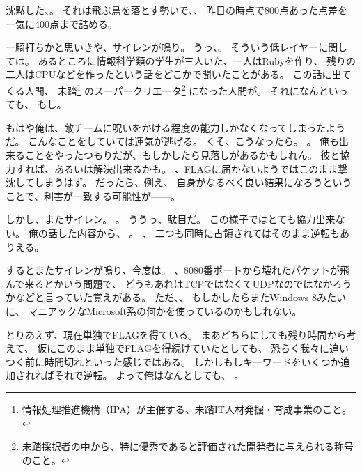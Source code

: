 沈黙した、。
それは飛ぶ鳥を落とす勢いで、、
昨日の時点で800点あった点差を一気に400点まで詰める。

一騎打ちかと思いきや、サイレンが鳴り。
うっ、。
そういう低レイヤーに関しては。
あるところに情報科学類の学生が三人いた、一人はRubyを作り、
残りの二人はCPUなどを作ったという話をどこかで聞いたことがある。
この話に出てくる人間、
未踏\footnote{情報処理推進機構（IPA）が主催する、未踏IT人材発掘・育成事業のこと。}%
のスーパークリエータ\footnote{未踏採択者の中から、特に優秀であると評価された開発者に与えられる称号のこと。}%
になった人間が。
それになんといっても、
もし。

もはや俺は、敵チームに呪いをかける程度の能力しかなくなってしまったようだ。
こんなことをしていては運気が逃げる。
くそ、こうなったら。
。
俺も出来ることをやったつもりだが、もしかしたら見落しがあるかもしれん。
彼と協力すれば、あるいは解決出来るかも。
、FLAGに届かないようではこのまま撃沈してしまうはず。
だったら、例え、
自身がなるべく良い結果になろうということで、利害が一致する可能性が------。

しかし、またサイレン。
。
ううっ、駄目だ。
この様子ではとても協力出来ない。
俺の話した内容から、
。
、
二つも同時に占領されてはそのまま逆転もありえる。

するとまたサイレンが鳴り、今度は。
、8080番ポートから壊れたパケットが飛んで来るとかいう問題で、
どうもあれはTCPではなくてUDPなのではなかろうかなどと言っていた覚えがある。
ただ、、
もしかしたらまたWindows 8みたいに、
マニアックなMicrosoft系の何かを使っているのかもしれない。

とりあえず、現在単独でFLAGを得ている。
まあどちらにしても残り時間から考えて、
仮にこのまま単独でFLAGを得続けていたとしても、
恐らく我々に追いつく前に時間切れといった感じではある。
しかしもしキーワードをいくつか追加されればそれで逆転。
よって俺はなんとしても、
。

